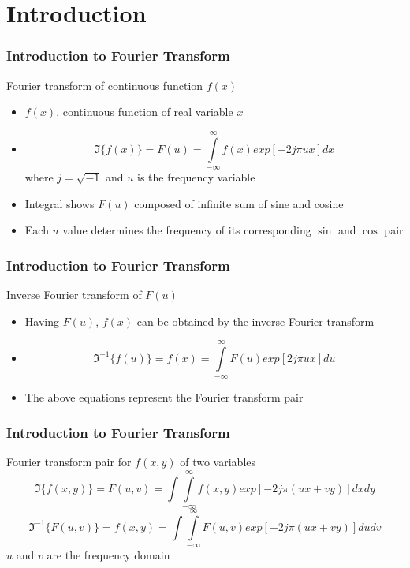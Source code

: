 \documentclass{beamer}
\begin{document}
\section{Introduction}
\begin{frame}
\frametitle{Introduction to Fourier Transform}
\begin{block}{Fourier transform of continuous function $f(x)$}
\begin{itemize}
	\item $f(x)$, continuous function of real variable $x$
	\item []
	$$\Im\lbrace f(x)\rbrace = F(u) = \int\limits_{-\infty}^{\infty} f(x) exp[-2j\pi ux] dx$$
	\noindent where $j = \sqrt{-1}$ and $u$ is the frequency variable
	\item Integral shows $F(u)$ composed of infinite sum of sine and cosine 
	\item Each $u$ value determines the frequency of its corresponding $\sin$ and $\cos$ pair
\end{itemize}
\end{block}
\end{frame}
\begin{frame}
\frametitle{Introduction to Fourier Transform}
\begin{block}{Inverse Fourier transform of $F(u)$}
\begin{itemize}
	\item Having $F(u)$, $f(x)$ can be obtained by the inverse Fourier transform
	\item []
	$$\Im^{-1}\lbrace f(u)\rbrace = f(x) = \int\limits_{-\infty}^{\infty} F(u) exp[2j\pi ux] du$$
\end{itemize}
\end{block}

\begin{itemize}
\item The above equations represent the Fourier transform pair
\end{itemize}
\end{frame}
\begin{frame}
\frametitle{Introduction to Fourier Transform}
\begin{block}{Fourier transform pair for $f(x,y)$ of two variables}
	$$\Im\lbrace f(x,y)\rbrace = F(u,v) =\int \int\limits_{-\infty}^{\infty} f(x,y) exp[-2j\pi (ux+vy)] dx dy$$
	$$\Im^{-1}\lbrace F(u,v)\rbrace = f(x,y) =\int \int\limits_{-\infty}^{\infty} F(u,v) exp[-2j\pi (ux+vy)] du dv$$
	\noindent $u$ and $v$ are the frequency domain
\end{block}
\end{frame}
\end{document}

